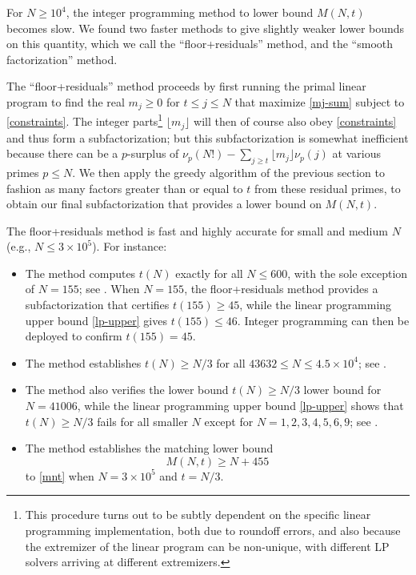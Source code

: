 \documentclass[12pt,a4paper,reqno]{amsart}
\numberwithin{equation}{section}
\theoremstyle{plain}
\theoremstyle{definition}
\begin{document}
For $N \geq 10^4$, the integer programming method to lower bound $M(N,t)$ becomes slow.  We found two faster methods to give slightly weaker lower bounds on this quantity, which we call the ``floor+residuals'' method, and the ``smooth factorization'' method.

The ``floor+residuals'' method proceeds by first running the primal linear program to find the real $m_j \geq 0$ for $t \leq j \leq N$ that maximize \eqref{mj-sum} subject to \eqref{constraints}.  The integer parts\footnote{This procedure turns out to be subtly dependent on the specific linear programming implementation, both due to roundoff errors, and also because the extremizer of the linear program can be non-unique, with different LP solvers arriving at different extremizers.} $\lfloor m_j \rfloor$ will then of course also obey \eqref{constraints} and thus form a subfactorization; but this subfactorization is somewhat inefficient because there can be a $p$-surplus of $\nu_p(N!) - \sum_{j \geq t} \lfloor m_j \rfloor \nu_p(j)$ at various primes $p \leq N$.  We then apply the greedy algorithm of the previous section to fashion as many factors greater than or equal to $t$ from these residual primes, to obtain our final subfactorization that provides a lower bound on $M(N,t)$.

The floor+residuals method is fast and highly accurate for small and medium $N$ (e.g., $N \leq 3 \times 10^5$).  For instance:
\begin{itemize}
  \item The method computes $t(N)$ exactly for all $N \leq 600$, with the sole exception of $N=155$; see .  When $N=155$, the floor+residuals method provides a subfactorization that certifies $t(155) \geq 45$, while the linear programming upper bound \eqref{lp-upper} gives $t(155) \leq 46$.  Integer programming can then be deployed to confirm $t(155)=45$.
  \item The method establishes $t(N) \geq N/3$ for all $43632 \leq N \leq 4.5 \times 10^4$; see .
  \item The method also verifies the lower bound $t(N)\geq N/3$ lower bound for $N=41006$, while the linear programming upper bound \eqref{lp-upper} shows that $t(N) \geq N/3$ fails for all smaller $N$ except for $N=1,2,3,4,5,6,9$; see .
  \item The method establishes the matching lower bound
\begin{equation}\label{mnt-lower}
M(N,t) \geq N + 455
\end{equation}
to \eqref{mnt} when $N = 3 \times 10^5$ and $t=N/3$.
\end{itemize}
\end{document}
